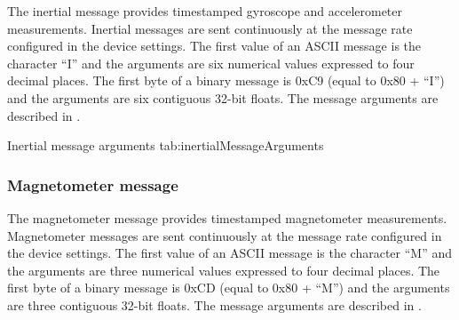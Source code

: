 The inertial message provides timestamped gyroscope and accelerometer measurements.  Inertial messages are sent continuously at the message rate configured in the device settings.  The first value of an \ac{ASCII} message is the character \enquote{I} and the arguments are six numerical values expressed to four decimal places.  The first byte of a binary message is 0xC9 (equal to 0x80 + \enquote{I}) and the arguments are six contiguous 32-bit floats.  The message arguments are described in .

\begingroup
    \def\tempArgumentA{Gyroscope X axis in degrees per second}
    \def\tempArgumentB{Gyroscope Y axis in degrees per second}
    \def\tempArgumentC{Gyroscope Z axis in degrees per second}
    \def\tempArgumentD{Accelerometer X axis in g}
    \def\tempArgumentE{Accelerometer Y axis in g}
    \def\tempArgumentF{Accelerometer Z axis in g}
    \dataMessageTable
    {Inertial message arguments}
    {tab:inertialMessageArguments}
\endgroup

\begingroup
    \def\tempNameA{Gyroscope X axis}
    \def\tempNameB{Gyroscope Y axis}
    \def\tempNameC{Gyroscope Z axis}
    \def\tempNameD{Accelerometer X axis}
    \def\tempNameE{Accelerometer Y axis}
    \def\tempNameF{Accelerometer Z axis}
    \def\tempValueA{0}
    \def\tempValueB{0}
    \def\tempValueC{0}
    \def\tempValueD{0}
    \def\tempValueE{0}
    \def\tempValueF{1}
    \def\tempAsciiFirst{I}
    \def\tempAsciiA{0.0000}
    \def\tempAsciiB{0.0000}
    \def\tempAsciiC{0.0000}
    \def\tempAsciiD{0.0000}
    \def\tempAsciiE{0.0000}
    \def\tempAsciiF{1.0000}
    \def\tempBinaryFirst{C9}
    \def\tempBinaryA{00 00 00 00}
    \def\tempBinaryB{00 00 00 00}
    \def\tempBinaryC{00 00 00 00}
    \def\tempBinaryD{00 00 00 00}
    \def\tempBinaryE{00 00 00 00}
    \def\tempBinaryF{00 00 80 3F}
    \dataMessageExample
\endgroup

\subsubsection{Magnetometer message}

The magnetometer message provides timestamped magnetometer measurements.  Magnetometer messages are sent continuously at the message rate configured in the device settings.  The first value of an \ac{ASCII} message is the character \enquote{M} and the arguments are three numerical values expressed to four decimal places.  The first byte of a binary message is 0xCD (equal to 0x80 + \enquote{M}) and the arguments are three contiguous 32-bit floats.  The message arguments are described in .

